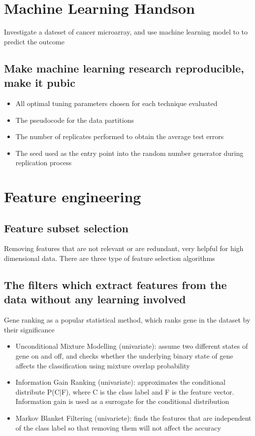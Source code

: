 \documentclass[11pt]{article}
\begin{document}
\section{Machine Learning Handson}
\label{sec:org8bf179e}
Investigate a dateset of cancer microarray, and use machine learning model to to predict the outcome   
\subsection{Make machine learning research reproducible, make it pubic}
\label{sec:org0acdfd4}
\begin{itemize}
\item All optimal tuning parameters chosen for each technique evaluated
\item The pseudocode for the data partitions
\item The number of replicates performed to obtain the average test errors
\item The seed used as the entry point into the random number generator during replication process
\end{itemize}
\section{Feature engineering}
\label{sec:orgedc11dd}
\subsection{Feature subset selection}
\label{sec:org520802e}
Removing features that are not relevant or are redundant, very helpful for high dimensional data. There are three type of feature selection algorithms
\subsection{The filters which extract features from the data without any learning involved}
\label{sec:orgac06cd8}
Gene ranking as a popular statistical method, which ranks gene in the dataset by their significance
\begin{itemize}
\item Unconditional Mixture Modelling (univariate): assume two different states of gene on and off, and checks whether the underlying binary state of gene affects the classification using mixture overlap probability
\item Information Gain Ranking (univariate): approximates the conditional distribute P(C|F), where C is the class label and F is the feature vector. Information gain is used as a surrogate for the conditional distribution
\item Markov Blanket Filtering (univariete): finds the features that are independent of the class label so that removing them will not affect the accuracy
\end{itemize}
\end{document}
